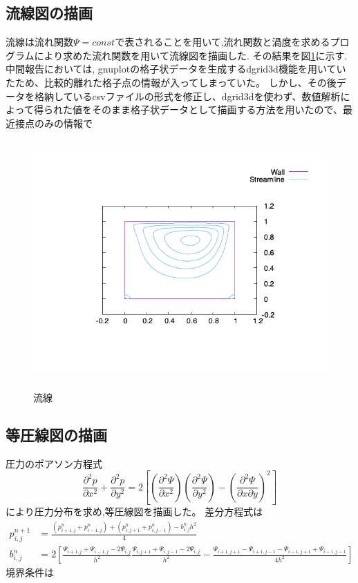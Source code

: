 \documentclass[upLaTeX,a4paper]{jsarticle}
\begin{document}
\subsection{流線図の描画}
流線は流れ関数$\varPsi = const$で表されることを用いて,流れ関数と渦度を求めるプログラムにより求めた流れ関数を用いて流線図を描画した.
その結果を図\ref{fig:stream_line}に示す.
中間報告においては, gnuplotの格子状データを生成するdgrid3d機能を用いていたため、比較的離れた格子点の情報が入ってしまっていた。
しかし、その後データを格納しているcsvファイルの形式を修正し、dgrid3dを使わず、数値解析によって得られた値をそのまま格子状データとして描画する方法を用いたので、最近接点のみの情報で

\begin{figure}[H]
  \centering
  \includegraphics[height=9.5cm]{outputs/img/stream_line.png}
  \caption{流線}
  \label{fig:stream_line}
\end{figure}
\subsection{等圧線図の描画}
圧力のポアソン方程式
\begin{equation}
  \frac{\partial ^2 p}{\partial x ^2} + \frac{\partial ^2 p}{\partial y ^2} = 2 \left[ \left(\frac{\partial ^2 \varPsi}{\partial x ^2}\right) \left(\frac{\partial ^2 \varPsi}{\partial y ^2}\right) - \left( \frac{\partial ^2 \varPsi}{\partial x \partial y}  \right) ^2 \right]
\end{equation}
により圧力分布を求め,等圧線図を描画した。
差分方程式は
\begin{equation}
  \begin{split}
    p_{i,j}^{n+1} & =\frac{(p_{i+1,j}^{n}+p_{i-1,j}^{n})+(p_{i,j+1}^{n}+p_{i,j-1}^{n})-b_{i,j}^{n}h^2}{4}\\
    b_{i,j}^{n} & = 2\left[ \frac{\varPsi_{i+1,j}+\varPsi_{i-1,j}- 2\varPsi_{i,j}}{h^2} \frac{\varPsi_{i,j+1}+\varPsi_{i,j-1}-2\varPsi_{i,j}}{h^2} - \frac{\varPsi_{i+1,j+1}-\varPsi_{i+1,j-1}-\varPsi_{i-1,j+1}+\varPsi_{i-1,j-1}}{4h^2}  \right]
  \end{split}
\end{equation}
境界条件は
\end{document}
